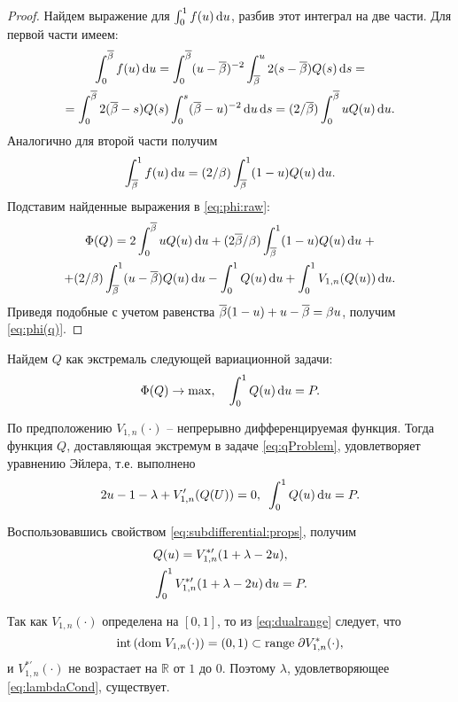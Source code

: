 {\begin{proof}
  Найдем выражение для $\int_0^1 f(u) \mathop{}\!\mathrm{d} u$, разбив этот интеграл на две части.
  Для первой части имеем:
  \begin{multline*}
    \int_0^{{\overline{\beta}}} f(u) \mathop{}\!\mathrm{d} u = \int_0^{{\overline{\beta}}} (u - {\overline{\beta}})^{-2} \int_{{\overline{\beta}}}^u 2(s - {\overline{\beta}}) Q(s) \mathop{}\!\mathrm{d} s = \\
    = \int_0^{{\overline{\beta}}} 2 ({\overline{\beta}} - s) Q(s) \int_0^s ({\overline{\beta}} - u)^{-2} \mathop{}\!\mathrm{d} u \mathop{}\!\mathrm{d} s =
      (2/{\overline{\beta}}) \int_0^{{\overline{\beta}}} u Q(u) \mathop{}\!\mathrm{d} u.
  \end{multline*}
  Аналогично для второй части получим
  \begin{gather*}
    \int_{{\overline{\beta}}}^1 f(u) \mathop{}\!\mathrm{d} u = (2/\beta) \int_{{\overline{\beta}}}^1 (1-u) Q(u) \mathop{}\!\mathrm{d} u.
  \end{gather*}
  Подставим найденные выражения в \eqref{eq:phi:raw}:
  \begin{multline*}
    \Phi(Q) = 2 \int_0^{{\overline{\beta}}} u Q(u) \mathop{}\!\mathrm{d} u + (2{\overline{\beta}}/\beta) \int_{{\overline{\beta}}}^1 (1-u) Q(u) \mathop{}\!\mathrm{d} u \; + \\
    + (2/\beta) \int_{{\overline{\beta}}}^1 (u - {\overline{\beta}}) Q(u) \mathop{}\!\mathrm{d} u -
      \int_0^1 Q(u) \mathop{}\!\mathrm{d} u + \int_0^1 V_{1,n}(Q(u)) \mathop{}\!\mathrm{d} u.
  \end{multline*}
  Приведя подобные с учетом равенства ${\overline{\beta}} (1-u) + u - {\overline{\beta}} = \beta u$, получим \eqref{eq:phi(q)}.
\end{proof}

Найдем $Q$ как экстремаль следующей вариационной задачи:
\begin{align}
  \label{eq:qProblem}
  \Phi(Q) \rightarrow \max, \quad
  \int_0^1 Q(u) \mathop{}\!\mathrm{d} u = P.
\end{align}

По предположению $V_{1,n}(\cdot)$ -- непрерывно дифференцируемая функция.
Тогда функция $Q$, доставляющая экстремум в задаче \eqref{eq:qProblem}, удовлетворяет уравнению Эйлера, т.е. выполнено
\[
  2u - 1 - \lambda + V_{1,n}'(Q(U)) = 0, \enskip
  \int_0^1 Q(u) \mathop{}\!\mathrm{d} u = P.
\]

Воспользовавшись свойством \eqref{eq:subdifferential:props}, получим
\begin{align}
  \label{eq:qFormula}
  &Q(u) = V^{*\prime}_{1,n}(1+\lambda-2u),\\
  \label{eq:lambdaCond}
  &\int_0^1 V^{*\prime}_{1,n}(1+\lambda-2u) \mathop{}\!\mathrm{d} u = P.
\end{align}

Так как $V_{1,n}(\cdot)$ определена на $[0, 1]$, то из \eqref{eq:dualrange} следует, что
\begin{equation*}
  \mathrm{int} \left( \mathrm{dom\;} V_{1,n}(\cdot) \right)
  = (0, 1)
  \subset \mathrm{range\;} \partial V_{1,n}^*(\cdot),
\end{equation*}
и $V^{*\prime}_{1,n}(\cdot)$ не возрастает на $\mathbb{R}$ от $1$ до $0$.
Поэтому $\lambda$, удовлетворяющее
\eqref{eq:lambdaCond}, существует.

}
